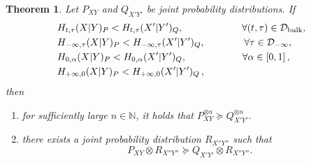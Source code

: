 \documentclass[aps,pra,11pt,onecolumn,nofootinbib,tightenlines]{revtex4-2}
\newtheorem{theorem}{Theorem}[section]
\theoremstyle{definition}
\newcommand{\D}{\mathcal{D}}
\begin{document}
\begin{theorem}
\label{th: large sample and catalytic}
    Let $P_{XY}$ and $Q_{X'Y'}$ be joint probability distributions. If
    \begin{align}
    & H_{t,\tau}(X|Y)_P < H_{t,\tau}(X'|Y')_Q, \qquad\qquad\qquad   \forall (t,\tau) \in \D_{\rm{bulk}},\label{eq:TempCond} \\
    &H_{-\infty,\tau}(X|Y)_P < H_{-\infty,\tau}(X'|Y')_Q, \; \quad\qquad \;\;\, \forall \tau\in \D_{-\infty},\label{eq:TropCond} \\
    &H_{0,\alpha}(X|Y)_P<H_{0,\alpha}(X'|Y')_Q,  \quad\,\quad\qquad\quad\;\; \forall \alpha\in[0,1]\,,\label{eq:DerivCond} \\
    &H_{+\infty,0}(X|Y)_P < H_{+\infty,0}(X'|Y')_Q\,,
    \end{align}
    then
   \begin{enumerate}[itemsep=0pt]
    \item for sufficiently large \(n \in \mathbb{N}\), it holds that $P_{XY}^{\otimes n} \succeq Q_{X'Y'}^{\otimes n}$.
    \item there exists a joint probability distribution \(R_{X''Y''}\) such that
    \begin{equation}
        P_{XY} \otimes R_{X''Y''} \succeq Q_{X'Y'} \otimes R_{X''Y''}.
    \end{equation}
\end{enumerate}
\end{theorem}
\end{document}
